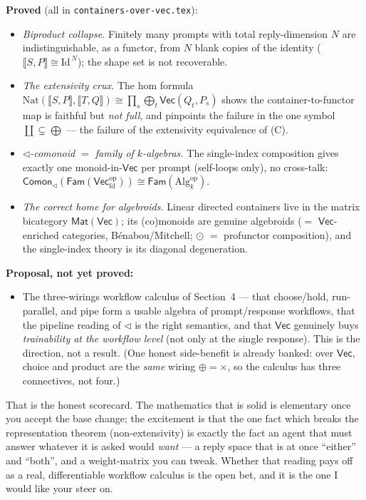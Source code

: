 \documentclass[11pt]{article}
\providecommand{\Vec}{}\renewcommand{\Vec}{\mathsf{Vec}}
\newcommand{\Fam}{\mathsf{Fam}}
\newcommand{\Mat}{\mathsf{Mat}}
\newcommand{\Comon}{\mathsf{Comon}}
\newcommand{\op}{\mathrm{op}}
\newcommand{\fld}{k}
\newcommand{\Nat}{\mathrm{Nat}}
\newcommand{\Id}{\mathrm{Id}}
\newcommand{\ext}[1]{\llbracket #1 \rrbracket}
\begin{document}
\textbf{Proved} (all in \texttt{containers-over-vec.tex}):
\begin{itemize}[leftmargin=1.4em,itemsep=1pt]
\item \emph{Biproduct collapse.} Finitely many prompts with total reply-dimension $N$
  are indistinguishable, as a functor, from $N$ blank copies of the identity
  ($\ext{S,P}\cong\Id^{\,N}$); the shape set is not recoverable.
\item \emph{The extensivity crux.} The hom formula
  $\Nat(\ext{S,P},\ext{T,Q})\cong\prod_s\bigoplus_t\Vec(Q_t,P_s)$ shows the
  container-to-functor map is faithful but \emph{not full}, and pinpoints the failure in
  the one symbol $\coprod\subsetneq\bigoplus$ --- the failure of the extensivity
  equivalence of (C).
\item \emph{$\lhd$-comonoid $=$ family of $\fld$-algebras.} The single-index composition
  gives exactly one monoid-in-$\Vec$ per prompt (self-loops only), no cross-talk:
  $\Comon_\lhd(\Fam(\Vec_{\mathrm{fd}}^\op))\cong\Fam(\mathrm{Alg}_\fld^\op)$.
\item \emph{The correct home for algebroids.} Linear directed containers live in the
  matrix bicategory $\Mat(\Vec)$; its (co)monoids are genuine algebroids
  ($=$ $\Vec$-enriched categories, B\'enabou/Mitchell; $\odot$ $=$ profunctor
  composition), and the single-index theory is its diagonal degeneration.
\end{itemize}

\textbf{Proposal, not yet proved:}
\begin{itemize}[leftmargin=1.4em,itemsep=1pt]
\item The three-wirings workflow calculus of Section~4 --- that
  choose/hold, run-parallel, and pipe form a usable algebra of prompt/response
  workflows, that the pipeline reading of $\lhd$ is the right semantics, and that $\Vec$
  genuinely buys \emph{trainability at the workflow level} (not only at the single
  response). This is the direction, not a result. (One honest side-benefit is already
  banked: over $\Vec$, choice and product are the \emph{same} wiring $\oplus=\times$, so
  the calculus has three connectives, not four.)
\end{itemize}

That is the honest scorecard. The mathematics that is solid is elementary once you
accept the base change; the excitement is that the one fact which breaks the
representation theorem (non-extensivity) is exactly the fact an agent that must answer
whatever it is asked would \emph{want} --- a reply space that is at once ``either'' and
``both'', and a weight-matrix you can tweak. Whether that reading pays off as a real,
differentiable workflow calculus is the open bet, and it is the one I would like your
steer on.
\end{document}
